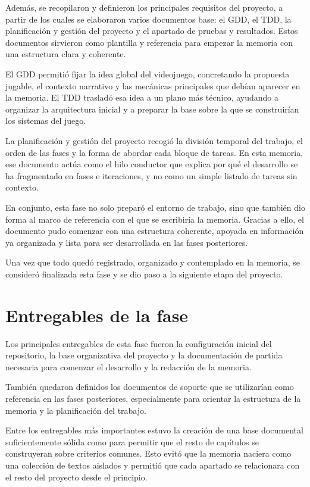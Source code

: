 Además, se recopilaron y definieron los principales requisitos del proyecto, a partir de los cuales
se elaboraron varios documentos base: el GDD, el TDD, la planificación y gestión del proyecto y el
apartado de pruebas y resultados. Estos documentos sirvieron como plantilla y referencia para empezar
la memoria con una estructura clara y coherente.

El GDD permitió fijar la idea global del videojuego, concretando la propuesta jugable, el contexto
narrativo y las mecánicas principales que debían aparecer en la memoria. El TDD trasladó esa idea a
un plano más técnico, ayudando a organizar la arquitectura inicial y a preparar la base sobre la que
se construirían los sistemas del juego.

La planificación y gestión del proyecto recogió la división temporal del trabajo, el orden de las
fases y la forma de abordar cada bloque de tareas. En esta memoria, ese documento actúa como el hilo
conductor que explica por qué el desarrollo se ha fragmentado en fases e iteraciones, y no como un
simple listado de tareas sin contexto.

En conjunto, esta fase no solo preparó el entorno de trabajo, sino que también dio forma al marco de
referencia con el que se escribiría la memoria. Gracias a ello, el documento pudo comenzar con una
estructura coherente, apoyada en información ya organizada y lista para ser desarrollada en las fases
posteriores.

Una vez que todo quedó registrado, organizado y contemplado en la memoria, se consideró finalizada
esta fase y se dio paso a la siguiente etapa del proyecto.

\section{Entregables de la fase}
Los principales entregables de esta fase fueron la configuración inicial del repositorio, la base
organizativa del proyecto y la documentación de partida necesaria para comenzar el desarrollo y la
redacción de la memoria.

También quedaron definidos los documentos de soporte que se utilizarían como referencia en las fases
posteriores, especialmente para orientar la estructura de la memoria y la planificación del trabajo.

Entre los entregables más importantes estuvo la creación de una base documental suficientemente sólida
como para permitir que el resto de capítulos se construyeran sobre criterios comunes. Esto evitó que
la memoria naciera como una colección de textos aislados y permitió que cada apartado se relacionara
con el resto del proyecto desde el principio.

